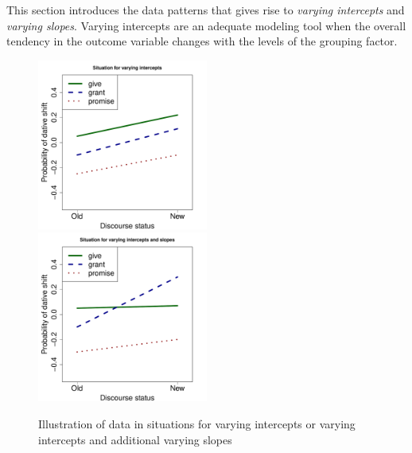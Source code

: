 \documentclass[a4paper,12pt]{article}
\begin{document}
This section introduces the data patterns that gives rise to \textit{varying intercepts} and \textit{varying slopes}. 
Varying intercepts are an adequate modeling tool when the overall tendency in the outcome variable changes with the levels of the grouping factor.

\begin{figure}[!htpb]
  \centering
  \includegraphics[width=0.5\textwidth]{graphics/var_int}~\includegraphics[width=0.5\textwidth]{graphics/var_int_slope}
  \caption{Illustration of data in situations for varying intercepts or varying intercepts and additional varying slopes}
  \label{fig:varintlsope}
\end{figure}

\enlargethispage{\baselineskip}
\end{document}
